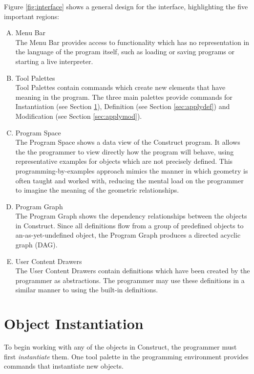 \documentclass[twoside,11pt]{report}
\begin{document}
Figure \ref{fig:interface} shows a general design for the interface, highlighting the five important regions:

\begin{enumerate}[(A)]
  \item Menu Bar \\
    The Menu Bar provides access to functionality which has no representation in the language of the program itself, such as loading or saving programs or starting a live interpreter.
  \item Tool Palettes \\
    Tool Palettes contain commands which create new elements that have meaning in the program. 
    The three main palettes provide commands for Instantiation (see Section \ref{sec:inst}), Definition (see Section \ref{sec:applydef}) and Modification (see Section \ref{sec:applymod}).
  \item Program Space \\
    The Program Space shows a data view of the Construct program. 
    It allows the the programmer to view directly how the program will behave, using representative examples for objects which are not precisely defined. 
    This programming-by-examples approach mimics the manner in which geometry is often taught and worked with, reducing the mental load on the programmer to imagine the meaning of the geometric relationships.
  \item Program Graph \\
    The Program Graph shows the dependency relationships between the objects in Construct. 
    Since all definitions flow from a group of predefined objects to an-as-yet-undefined object, the Program Graph produces a directed acyclic graph (DAG).
  \item User Content Drawers \\
    The User Content Drawers contain definitions which have been created by the programmer as abstractions.
    The programmer may use these definitions in a similar manner to using the built-in definitions.
\end{enumerate}

\section{Object Instantiation}
\label{sec:inst}

To begin working with any of the objects in Construct, the programmer must first {\it instantiate} them. 
One tool palette in the programming environment provides commands that instantiate new objects. 
\end{document}
